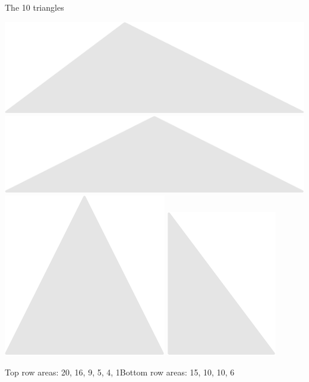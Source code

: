 \documentclass[14pt]{beamer}
\begin{document}
\begin{frame}{The 10 triangles}
\begin{center}
            \includegraphics[scale=0.3]{figures/figure024g.pdf}\quad
            \includegraphics[scale=0.3]{figures/figure024h.pdf}\quad
            \includegraphics[scale=0.3]{figures/figure024i.pdf}\quad
            \includegraphics[scale=0.3]{figures/figure024j.pdf}\\

            \bigskip

            {\footnotesize Top row areas: 20, 16, 9, 5, 4, 1\qquad Bottom row areas: 15, 10, 10, 6}
        \end{center}
    \end{frame}
\end{document}

